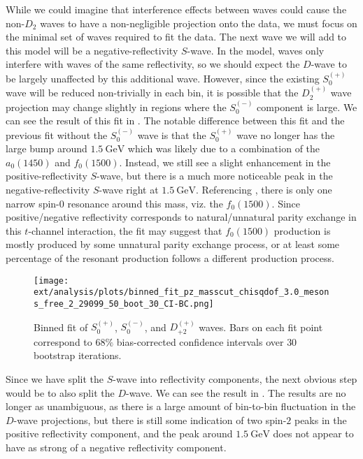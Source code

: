 While we could imagine that interference effects between waves could cause the non-$D_2$ waves to have a non-negligible projection onto the data, we must focus on the minimal set of waves required to fit the data. The next wave we will add to this model will be a negative-reflectivity $S$-wave. In the model, waves only interfere with waves of the same reflectivity, so we should expect the $D$-wave to be largely unaffected by this additional wave. However, since the existing $S_0^{(+)}$ wave will be reduced non-trivially in each bin, it is possible that the $D_2^{(+)}$ wave projection may change slightly in regions where the $S_0^{(-)}$ component is large. We can see the result of this fit in . The notable difference between this fit and the previous fit without the $S_0^{(-)}$ wave is that the $S_0^{(+)}$ wave no longer has the large bump around $\SI{1.5}{\giga\electronvolt}$ which was likely due to a combination of the $a_0(1450)$ and $f_0(1500)$. Instead, we still see a slight enhancement in the positive-reflectivity $S$-wave, but there is a much more noticeable peak in the negative-reflectivity $S$-wave right at $\SI{1.5}{\giga\electronvolt}$. Referencing , there is only one narrow spin-$0$ resonance around this mass, viz. the $f_0(1500)$. Since positive/negative reflectivity corresponds to natural/unnatural parity exchange in this $t$-channel interaction, the fit may suggest that $f_0(1500)$ production is mostly produced by some unnatural parity exchange process, or at least some percentage of the resonant production follows a different production process.

\begin{figure}
  \begin{center}
    \texttt{[image: ext/analysis/plots/binned\_fit\_pz\_masscut\_chisqdof\_3.0\_mesons\_free\_2\_29099\_50\_boot\_30\_CI-BC.png]}
  \end{center}
  \caption{Binned fit of $S_{0}^{(+)}$, $S_{0}^{(-)}$, and $D_{+2}^{(+)}$ waves. Bars on each fit point correspond to $68\%$ bias-corrected confidence intervals over $ 30 $ bootstrap iterations.}\label{fig:binned-fit-chisqdof-3.0-Spn-D2p}
\end{figure}

Since we have split the $S$-wave into reflectivity components, the next obvious step would be to also split the $D$-wave. We can see the result in . The results are no longer as unambiguous, as there is a large amount of bin-to-bin fluctuation in the $D$-wave projections, but there is still some indication of two spin-$2$ peaks in the positive reflectivity component, and the peak around $\SI{1.5}{\giga\electronvolt}$ does not appear to have as strong of a negative reflectivity component.

